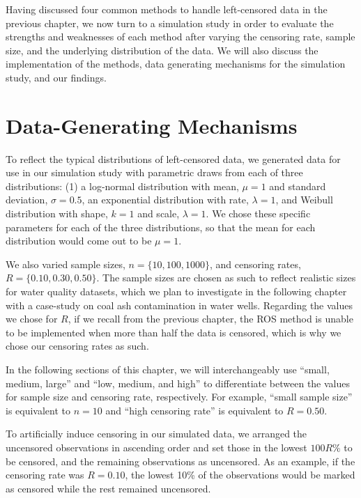 \documentclass[12pt, twoside]{amherstthesis}
\begin{document}
Having discussed four common methods to handle left-censored data in the previous chapter, we now turn to a simulation study in order to evaluate the strengths and weaknesses of each method after varying the censoring rate, sample size, and the underlying distribution of the data. We will also discuss the implementation of the methods, data generating mechanisms for the simulation study, and our findings.

\hypertarget{data_generating_mechanisms}{%
\section{Data-Generating Mechanisms}\label{data_generating_mechanisms}}

To reflect the typical distributions of left-censored data, we generated data for use in our simulation study with parametric draws from each of three distributions: (1) a log-normal distribution with mean, \(\mu = 1\) and standard deviation, \(\sigma = 0.5\), an exponential distribution with rate, \(\lambda = 1\), and Weibull distribution with shape, \(k = 1\) and scale, \(\lambda = 1\). We chose these specific parameters for each of the three distributions, so that the mean for each distribution would come out to be \(\mu = 1\).

We also varied sample sizes, \(n = \{10, 100, 1000\}\), and censoring rates, \(R = \{0.10, 0.30, 0.50\}\). The sample sizes are chosen as such to reflect realistic sizes for water quality datasets, which we plan to investigate in the following chapter with a case-study on coal ash contamination in water wells. Regarding the values we chose for \(R\), if we recall from the previous chapter, the ROS method is unable to be implemented when more than half the data is censored, which is why we chose our censoring rates as such.

In the following sections of this chapter, we will interchangeably use ``small, medium, large'' and ``low, medium, and high'' to differentiate between the values for sample size and censoring rate, respectively. For example, ``small sample size'' is equivalent to \(n = 10\) and ``high censoring rate'' is equivalent to \(R = {0.50}\).

To artificially induce censoring in our simulated data, we arranged the uncensored observations in ascending order and set those in the lowest \(100R \%\) to be censored, and the remaining observations as uncensored. As an example, if the censoring rate was \(R = 0.10\), the lowest 10\% of the observations would be marked as censored while the rest remained uncensored.
\end{document}
